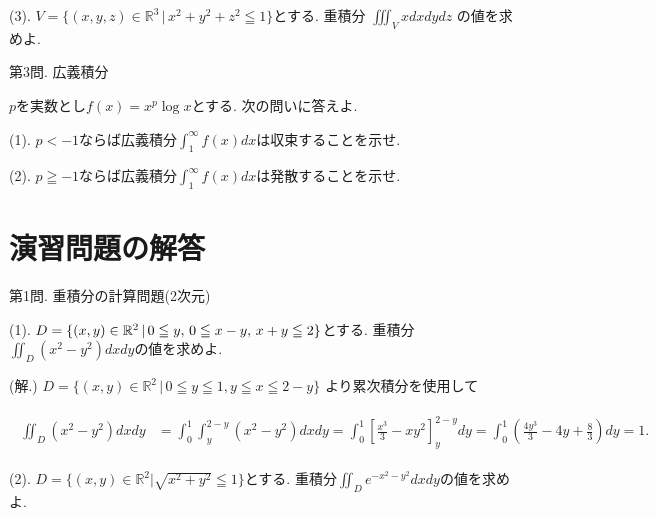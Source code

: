\documentclass[dvipdfmx,a4paper,11pt]{article}
\newcommand{\R}{\mathbb{R}}
\theoremstyle{definition}
\begin{document}
{\large(3). $ V = \{ (x,y,z) \in \R^3\,|\, x^2 + y^2 + z^2 \leqq 1\}$とする. 重積分
$\iiint_{V} x dxdydz$ の値を求めよ.}


\vspace{22pt}
{\Large 第3問.} 広義積分
\vspace{11pt}



{\large$p$を実数とし$f(x) = x^p \log x$とする. 次の問いに答えよ. }
\vspace{11pt}

{\large(1). $p< -1$ならば広義積分$\int_{1}^{\infty} f(x) dx$は収束することを示せ.}\vspace{4pt}

{\large(2). $p\geqq -1$ならば広義積分$\int_{1}^{\infty} f(x) dx$は発散することを示せ.}



\newpage
\section{演習問題の解答}

\hspace{11pt}
{\Large 第1問.} 重積分の計算問題(2次元)
\vspace{11pt}

{\large(1). $D=\{ (x,y) \in \R^2 \,|\, 0 \leqq y, \text{\,} 0 \leqq x-y, \text{\,} x+y \leqq 2\}$とする.
重積分$\iint_{D} (x^2-y^2)dxdy$の値を求めよ.}\vspace{5pt}

\hspace{-11pt}(解.) 
   $D= \{ (x,y) \in \R^2 \,|\, 0 \leqq y \leqq 1, 
y \leqq x  \leqq 2-y \}$
より累次積分を使用して
 
\begin{align*}
\begin{split}
\iint_{D} (x^2 -y^2) dxdy
&= \int_{0}^{1} 
 \int_{y}^{2-y} (x^2 -y^2) dxdy =\int_{0}^{1} 
 \left[ \frac{x^3}{3} - x y^2 \right]_{y}^{2-y} dy=
\int_{0}^{1} 
\left( \frac{4 y^3}{3} -4y + \frac{8}{3} \right) dy
=1.
    \end{split}
  \end{align*}
  

{\large(2). $D= \{ (x,y)\in \R^2 | \sqrt{x^2 + y^2 } \leqq 1  \}$とする. 
重積分$\iint_{D} e^{-x^2-y^2}dxdy$の値を求めよ. }
\end{document}
